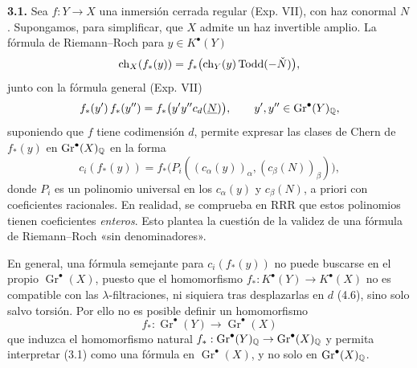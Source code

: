 \textbf{3.1.} Sea $f:Y\to X$ una inmersión cerrada regular (Exp. VII), con
haz conormal $N$. Supongamos, para simplificar, que $X$ admite un haz
invertible amplio. La fórmula de Riemann--Roch para $y\in K^\bullet(Y)$
\[
\ch_X(f_*(y))=f_*\bigl(\ch_Y(y)\operatorname{Todd}(-\check N)\bigr),
\]
junto con la fórmula general (Exp. VII)
\[
f_*(y')\,f_*(y'')=f_*\bigl(y'y''c_d(\underline N)\bigr),\qquad
y',y''\in\operatorname{Gr}^\bullet(Y)_\Q,
\]
suponiendo que $f$ tiene codimensión $d$, permite expresar las clases de
Chern de $f_*(y)$ en $\operatorname{Gr}^\bullet(X)_\Q$ en la forma
\begin{equation}\tag{3.1}
c_i(f_*(y))=f_*\bigl(P_i((c_\alpha(y))_\alpha,
(c_\beta(N))_\beta)\bigr),
\end{equation}
donde $P_i$ es un polinomio universal en los $c_\alpha(y)$ y $c_\beta(N)$,
a priori con coeficientes racionales. En realidad, se comprueba en RRR que
estos polinomios tienen coeficientes \emph{enteros}. Esto plantea la cuestión
de la validez de una fórmula de Riemann--Roch «sin denominadores».

En general, una fórmula semejante para $c_i(f_*(y))$ no puede buscarse en el
propio $\operatorname{Gr}^\bullet(X)$, puesto que el homomorfismo
$f_*:K^\bullet(Y)\to K^\bullet(X)$ no es compatible con las
$\lambda$-filtraciones, ni siquiera tras desplazarlas en $d$ (4.6), sino
solo salvo torsión. Por ello no es posible definir un homomorfismo
\[
f_*:\operatorname{Gr}^\bullet(Y)\longrightarrow
\operatorname{Gr}^\bullet(X)
\]
que induzca el homomorfismo natural
$\sisi{f}{f_*}:\operatorname{Gr}^\bullet(Y)_\Q\to
\operatorname{Gr}^\bullet(X)_\Q$ y permita interpretar (3.1) como una
fórmula en $\operatorname{Gr}^\bullet(X)$, y no solo en
$\operatorname{Gr}^\bullet(X)_\Q$.

